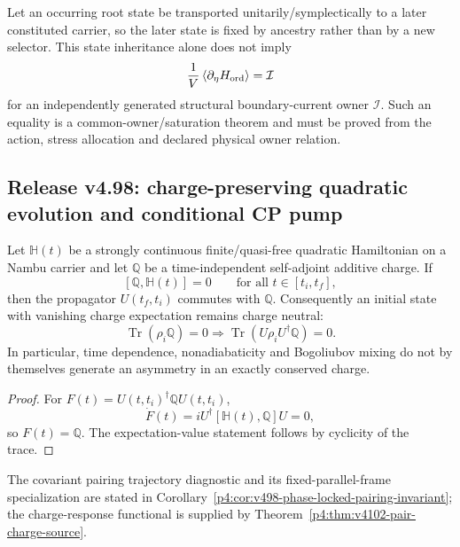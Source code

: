 \documentclass[12pt,a4paper]{article}
\begin{document}
\begin{corollary}
\label{p4:cor:v497-state-not-saturation}
Let an occurring root state be transported unitarily/symplectically to a later
constituted carrier, so the later state is fixed by ancestry rather than by a
new selector.  This state inheritance alone does not imply
\[
 \frac1V\left\langle\partial_\eta H_{\rm ord}\right\rangle
 =\mathcal I
\]
for an independently generated structural boundary-current owner $\mathcal I$.
Such an equality is a common-owner/saturation theorem and must be proved from
the action, stress allocation and declared physical owner relation.
\end{corollary}



\subsection{Release v4.98: charge-preserving quadratic evolution and conditional CP pump}
\label{p4:sec:v498-charge-preserving-quadratic-evolution}

\begin{theorem}
\label{p4:thm:v498-no-charge-production}
Let $\mathbb H(t)$ be a strongly continuous finite/quasi-free quadratic
Hamiltonian on a Nambu carrier and let $\mathbb Q$ be a time-independent
self-adjoint additive charge.  If
\[
 [\mathbb Q,\mathbb H(t)]=0
 \qquad\text{for all }t\in[t_i,t_f],
\]
then the propagator $U(t_f,t_i)$ commutes with $\mathbb Q$.  Consequently an
initial state with vanishing charge expectation remains charge neutral:
\[
 \boxed{\operatorname{Tr}(\rho_i\mathbb Q)=0
 \Longrightarrow
 \operatorname{Tr}(U\rho_iU^\dagger\mathbb Q)=0.}
\]
In particular, time dependence, nonadiabaticity and Bogoliubov mixing do not
by themselves generate an asymmetry in an exactly conserved charge.
\end{theorem}

\begin{proof}
For $F(t)=U(t,t_i)^\dagger\mathbb Q U(t,t_i)$,
\[
 \dot F(t)=iU^\dagger[\mathbb H(t),\mathbb Q]U=0,
\]
so $F(t)=\mathbb Q$.  The expectation-value statement follows by cyclicity of
the trace.
\end{proof}

The covariant pairing trajectory diagnostic and its fixed-parallel-frame
specialization are stated in
Corollary~\ref{p4:cor:v498-phase-locked-pairing-invariant}; the charge-response
functional is supplied by Theorem~\ref{p4:thm:v4102-pair-charge-source}.
\end{document}

